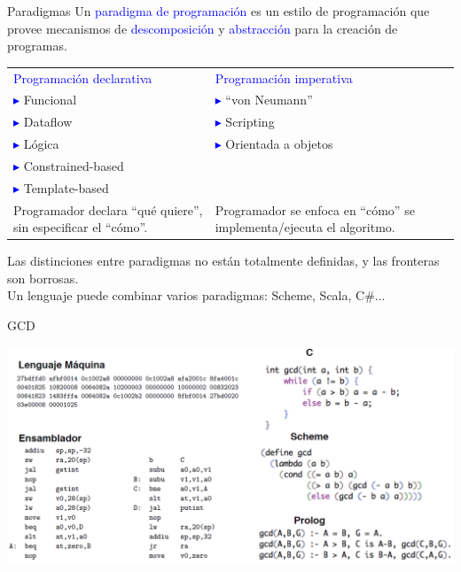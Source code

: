 \documentclass{beamer} %
\newcommand{\blue}[1]{\textcolor{blue}{#1}}
\begin{document}
\begin{frame}{Paradigmas}
  Un \blue{paradigma de programación} es un estilo de programación que provee mecanismos de \blue{descomposición} y \blue{abstracción} para la creación de programas.
  \medskip\pause
  
  \small{
  \begin{tabular}{p{30ex}p{30ex}}
    \blue{Programación declarativa} & \blue{Programación imperativa}\\
    \blue{$\blacktriangleright$} Funcional
      & \blue{$\blacktriangleright$} ``von Neumann''    \\
    \blue{$\blacktriangleright$} Dataflow
      & \blue{$\blacktriangleright$} Scripting          \\
    \blue{$\blacktriangleright$} Lógica
      & \blue{$\blacktriangleright$} Orientada a objetos\\
    \blue{$\blacktriangleright$} Constrained-based  &   \\
    \blue{$\blacktriangleright$} Template-based     &   \\
    \scriptsize{Programador declara ``qué quiere'', sin especificar el ``cómo''.}
      & \scriptsize{Programador se enfoca en ``cómo'' se implementa/ejecuta el algoritmo.}
  \end{tabular}}
  \medskip\pause
  
  Las distinciones entre paradigmas no están totalmente definidas, y las fronteras son borrosas.\\
  Un lenguaje puede combinar varios paradigmas: Scheme, Scala, C\#...
\end{frame}

\begin{frame}{GCD}
    \begin{center}
      \includegraphics[width=\textwidth]{./image/cap1/GCD}
    \end{center}
\end{frame}
\end{document}
